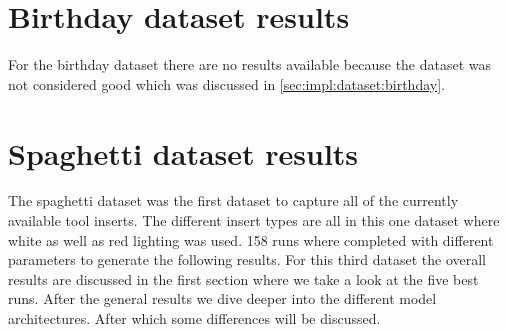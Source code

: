 \section{Birthday dataset results}
	For the birthday dataset there are no results available because the dataset was not considered good which was discussed in \ref{sec:impl:dataset:birthday}.

\section{Spaghetti dataset results}
	The spaghetti dataset was the first dataset to capture all of the currently available tool inserts. The different insert types are all in this one dataset where white as well as red lighting was used. 158 runs where completed with different parameters to generate the following results.
	For this third dataset the overall results are discussed in the first section where we take a look at the five best runs. After the general results we dive deeper into the different model architectures. After which some differences will be discussed.

